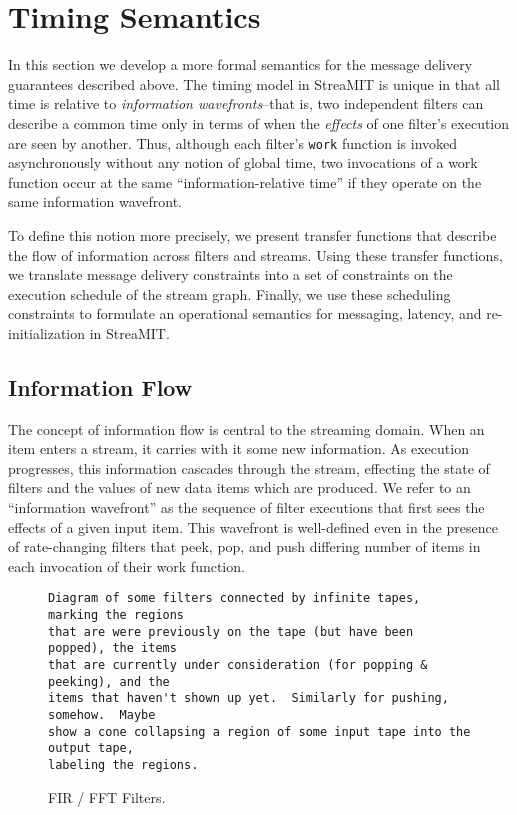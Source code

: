 \section{Timing Semantics}

In this section we develop a more formal semantics for the message
delivery guarantees described above.  The timing model in StreaMIT is
unique in that all time is relative to {\it information
wavefronts}--that is, two independent filters can describe a common time
only in terms of when the {\it effects} of one filter's execution are
seen by another.  Thus, although each filter's {\tt work} function is
invoked asynchronously without any notion of global time, two
invocations of a work function occur at the same ``information-relative
time'' if they operate on the same information wavefront.

To define this notion more precisely, we present transfer functions that
describe the flow of information across filters and streams.  Using
these transfer functions, we translate message delivery constraints into
a set of constraints on the execution schedule of the stream graph.
Finally, we use these scheduling constraints to formulate an operational
semantics for messaging, latency, and re-initialization in StreaMIT.

\subsection{Information Flow}

The concept of information flow is central to the streaming domain.
When an item enters a stream, it carries with it some new information.
As execution progresses, this information cascades through the stream,
effecting the state of filters and the values of new data items which
are produced.  We refer to an ``information wavefront'' as the sequence
of filter executions that first sees the effects of a given input item.
This wavefront is well-defined even in the presence of rate-changing
filters that peek, pop, and push differing number of items in each
invocation of their work function.

\begin{figure}[t]
\begin{verbatim}
Diagram of some filters connected by infinite tapes, marking the regions
that are were previously on the tape (but have been popped), the items
that are currently under consideration (for popping & peeking), and the
items that haven't shown up yet.  Similarly for pushing, somehow.  Maybe
show a cone collapsing a region of some input tape into the output tape,
labeling the regions.
\end{verbatim}
\vspace{-12pt}
\caption{\protect\small FIR / FFT Filters.}
\vspace{-12pt}
\end{figure}


